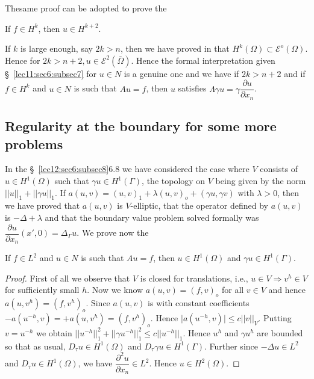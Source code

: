 The\pageoriginale same proof can be adopted to prove the 

\begin{coro*}%
  If $f \in H^k$, then $u \in H^{k + 2}$. 
\end{coro*}

If $k$ is large enough, say $2k > n$, then we have proved in that $H^k
(\Omega ) \subset \mathscr{E}^o (\Omega )$. Hence for $2k > n+2, u
\in \mathscr{E}^2 (\bar{\Omega})$. Hence the formal
interpretation given \S\ \ref{lec11:sec6:subsec7} for $u \in N $ is a genuine one
and we have if $2k > n+2$ and if $f \in H^k$ and $u
\in N$ is such that $Au = f$, then $u$ satisfies $\Lambda
\gamma u = \gamma \dfrac{\partial u}{\partial x_n}$.  

\subsection{Regularity at the boundary for some more problems}\label{lec18:sec9:subsec9}

In the \S\ \ref{lec12:sec6:subsec8}6.8 we have considered the case where $V$ consists of $u
\in H^1 (\Omega )$ such that $\gamma u \in H^1 (\Gamma
)$, the topology on $V$ being given by the norm $|| u ||_1 + || \gamma
u ||_1$. If $a (u, v) = (u, v)_1 + \lambda (u, v)_o + (\gamma u,
\gamma v)$ with $\lambda > 0$, then we have proved that $a (u, v )$ is
$V$-elliptic, that the operator defined by $a(u, v)$ is $-\Delta +
\lambda$ and that the boundary value problem solved formally was
$\dfrac{\partial u}{\partial x_n} (x' , 0) = \Delta _\Gamma u$. We
prove now the  

\begin{theorem}\label{lec18:sec9:subsec9:thm9.5}%
  If $f \in L^2$ and $u \in N$ is such that $Au = f$,
  then $u \in H^1 (\Omega )$ and $\gamma u \in H^1
  (\Gamma )$.  
\end{theorem}

\begin{proof}
  First of all we observe that $V$ is closed for translations, i.e.,
  $u \in V \Rightarrow v^h \in V$ for sufficiently small
  $h$. Now we know $a(u, v) = (f, v)_o$ for all $v \in V$ and
  hence $a(u, v^h) = (f, v^h)_o$. Since $a(u, v)$ is with constant
  coefficients $-a (u^{-h}, v) = + a(u, v^h) = (f, v^h)_o$. Hence $\big|
  a (u^{-h}, v)\big| \leq c || v ||_V$. Putting $v = u^{-h}$ we obtain
  $|| u^{-h} ||^2_1 + || \gamma u^{-h} ||^2_1 \leq c || u^{-h}
  ||_1$. Hence $u^h$ and $\gamma u^h$ are bounded so that as usual,
  $D_\tau u \in H^1 (\Omega )$ and $D_\tau \gamma u \in
  H^1 (\Gamma )$. Further since $-\Delta u \in L^2$ and $D_\tau
  u \in H^1 (\Omega)$, we have $\dfrac{\partial^2 u}{\partial
    x_n} \in L^2$. Hence $u \in H^2 (\Omega)$.  
\end{proof}

